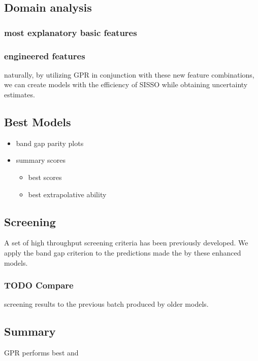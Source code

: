 \documentclass[aip, jmp, amsmath, amssymb]{revtex4-2}
\begin{document}
\subsection*{Domain analysis}
\label{sec:org64f7988}
\subsubsection*{most explanatory basic features}
\label{sec:org3f4d106}
\subsubsection*{engineered features}
\label{sec:org37ecae4}
naturally, by utilizing GPR in conjunction with these new feature
combinations, we can create models with the efficiency of SISSO while
obtaining uncertainty estimates.
\subsection*{Best Models}
\label{sec:orgf9acfc1}
\begin{itemize}
\item band gap parity plots
\item summary scores
\begin{itemize}
\item best scores
\item best extrapolative ability
\end{itemize}
\end{itemize}

\subsection*{Screening}
\label{sec:org96edd34}
A set of high throughput screening criteria has been previously
developed\cite{mannodi-kanakkithodi-2022-data-driven}. We apply the
band gap criterion to the predictions made the by these enhanced models.

\subsubsection*{{\bfseries\sffamily TODO} Compare}
\label{sec:org214956f}
screening results to the previous batch produced by older models.

\subsection*{Summary}
\label{sec:org0af6bbc}
GPR performs best and
\end{document}
